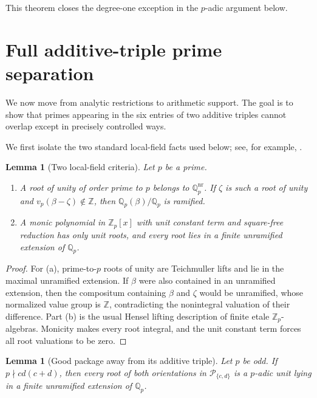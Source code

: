\documentclass[11pt]{article}
\numberwithin{equation}{section}
\newtheorem{lemma}[theorem]{Lemma}
\theoremstyle{definition}
\newcommand{\Q}{\mathbb Q}
\newcommand{\Z}{\mathbb Z}
\newcommand{\Package}{\mathcal P}
\begin{document}
This theorem closes the degree-one exception in the \(p\)-adic argument below.

\section{Full additive-triple prime separation}

We now move from analytic restrictions to arithmetic support.  The goal is to show that primes appearing in the six entries of two additive triples cannot overlap except in precisely controlled ways.
\label{sec:padic}

We first isolate the two standard local-field facts used below; see, for
example, \cite[Chapters~I--II]{SerreLocalFields}.

\begin{lemma}[Two local-field criteria]\label{lem:localcriteria}
Let \(p\) be a prime.
\begin{enumerate}[label=(\alph*)]
\item A root of unity of order prime to \(p\) belongs to
\(\Q_p^{\mathrm{nr}}\).  If \(\zeta\) is such a root of unity and
\(v_p(\beta-\zeta)\notin\Z\), then \(\Q_p(\beta)/\Q_p\) is ramified.
\item A monic polynomial in \(\Z_p[x]\) with unit constant term and
square-free reduction has only unit roots, and every root lies in a finite
unramified extension of \(\Q_p\).
\end{enumerate}
\end{lemma}

\begin{proof}
For (a), prime-to-\(p\) roots of unity are Teichmuller lifts and lie in the
maximal unramified extension.  If \(\beta\) were also contained in an
unramified extension, then the compositum containing \(\beta\) and \(\zeta\)
would be unramified, whose normalized value group is \(\Z\), contradicting
the nonintegral valuation of their difference.  Part (b) is the usual Hensel
lifting description of finite etale \(\Z_p\)-algebras.  Monicity makes every
root integral, and the unit constant term forces all root valuations to be
zero.
\end{proof}

\begin{lemma}[Good package away from its additive triple]
\label{lem:goodpackage}
Let \(p\) be odd.  If \(p\nmid cd(c+d)\), then every root of both
orientations in \(\Package_{\{c,d\}}\) is a \(p\)-adic unit lying in a
finite unramified extension of \(\Q_p\).
\end{lemma}
\end{document}
